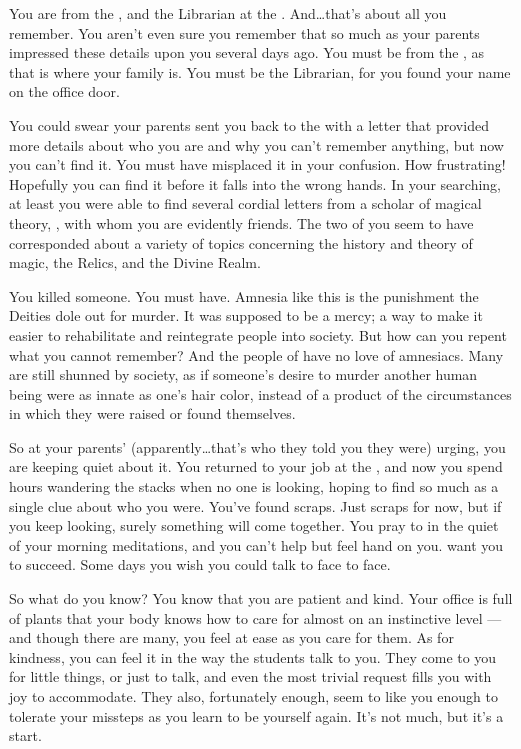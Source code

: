 \documentclass[char]{GL2020}
\begin{document}
\name{\cLibrarian{}}

You are \cLibrarian{\intro} from the \pTech{}, and the Librarian at the \pSchool{}. And\ldots that's about all you remember. You aren't even sure you remember that so much as your parents impressed these details upon you several days ago. You must be from the \pTech{}, as that is where your family is. You must be the Librarian, for you found your name on the office door. 

You could swear your parents sent you back to the \pSchool{} with a letter that provided more details about who you are and why you can’t remember anything, but now you can’t find it. You must have misplaced it in your confusion. How frustrating! Hopefully you can find it before it falls into the wrong hands. In your searching, at least you were able to find several cordial letters from a scholar of magical theory, \cWildCard{\intro}, with whom you are evidently friends. The two of you seem to have corresponded about a variety of topics concerning the history and theory of magic, the Relics, and the Divine Realm.

You killed someone. You must have. Amnesia like this is the punishment the Deities dole out for murder. It was supposed to be a mercy; a way to make it easier to rehabilitate and reintegrate people into society. But how can you repent what you cannot remember? And the people of \pEarth{} have no love of amnesiacs. Many are still shunned by society, as if someone's desire to murder another human being were as innate as one's hair color, instead of a product of the circumstances in which they were raised or found themselves.

So at your parents’ (apparently\ldots that’s who they told you they were) urging, you are keeping quiet about it. You returned to your job at the \pSchool{}, and now you spend hours wandering the stacks when no one is looking, hoping to find so much as a single clue about who you were. You've found scraps. Just scraps for now, but if you keep looking, surely something will come together. You pray to \cTechGod{\intro} in the quiet of your morning meditations, and you can't help but feel \cTechGod{\their} hand on you. \cTechGod{\They} want\cTechGod{\verbs} you to succeed. Some days you wish you could talk to \cTechGod{\them} face to face.

So what do you know? You know that you are patient and kind. Your office is full of plants that your body knows how to care for almost on an instinctive level — and though there are many, you feel at ease as you care for them. As for kindness, you can feel it in the way the students talk to you. They come to you for little things, or just to talk, and even the most trivial request fills you with joy to accommodate. They also, fortunately enough, seem to like you enough to tolerate your missteps as you learn to be yourself again. It's not much, but it's a start.
\end{document}
